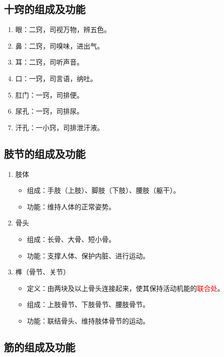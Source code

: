 \documentclass[cn,hazy,blue,12pt,normal,founder]{elegantnote}
\newcommand{\redt}[1]{\textcolor{red}{{}#1}}      %
\begin{document}
\subsection{十窍的组成及功能}

\begin{enumerate}
  \item 眼：二窍，司视万物，辨五色。
  \item 鼻：二窍，司嗅味，进出气。
  \item 耳：二窍，司听声音。
  \item 口：一窍，司言语，纳吐。
  \item 肛门：一窍，司排便。
  \item 尿孔：一窍，司排尿。
  \item 汗孔：一小窍，司排泄汗液。
\end{enumerate}

\subsection{肢节的组成及功能}

\begin{enumerate}
  \item 肢体
  \begin{itemize}
    \item 组成：手肢（上肢）、脚肢（下肢）、腰肢（躯干）。
    \item 功能：维持人体的正常姿势。
  \end{itemize}
  \item 骨头
  \begin{itemize}
    \item 组成：长骨、大骨、短小骨。
    \item 功能：支撑人体、保护内脏、进行运动。
  \end{itemize}
  \item 榫（骨节、关节）
  \begin{itemize}
    \item 定义：由两块及以上骨头连接起来，使其保持活动机能的\redt{联合处}。
    \item 组成：上肢骨节、下肢骨节、腰肢骨节。
    \item 功能：联结骨头、维持肢体骨节的运动。
  \end{itemize}
\end{enumerate}

\subsection{筋的组成及功能}
\end{document}
